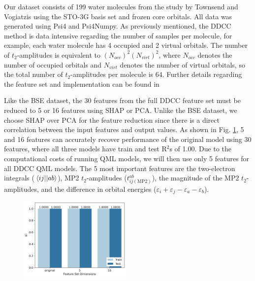 \documentclass[journal=jacsat,manuscript=article]{achemso}
\begin{document}
Our dataset consists of 199 water molecules from the study by Townsend and Vogiatzis using the STO-3G basis set\cite{hehre_selfconsistent_1970} and frozen core orbitals.
All data was generated using Psi4\cite{parrish_psi4_2017} and Psi4Numpy\cite{smith_psi4numpy_2018}.
As previously mentioned, the DDCC method is data intensive regarding the number of samples per molecule, for example, each water molecule has 4 occupied and 2 virtual orbitals.
The number of $t_{2}$-amplitudes is equivalent to $(N_{occ})^{2}(N_{virt})^{2}$, where $N_{occ}$ denotes the number of occupied orbitals and $N_{virt}$ denotes the number of virtual orbitals, so the total number of $t_{2}$-amplitudes per molecule is 64.
Further details regarding the feature set and implementation can be found in \cite{townsend_data-driven_2019}

Like the BSE dataset, the 30 features from the full DDCC feature set must be reduced to 5 or 16 features using SHAP or PCA.
Unlike the BSE dataset, we choose SHAP over PCA for the feature reduction since there is a direct correlation between the input features and output values.
As shown in Fig. \ref{fig:DDCC_feature_set}, 5 and 16 features can accurately recover performance of the original model using 30 features, where all three models have train and test R$^{2}$s of 1.00.
Due to the computational costs of running QML models, we will then use only 5 features for all DDCC QML models.
The 5 most important features are the two-electron integrals ($\mel{ij}{}{ab}$), MP2 $t_{2}$-amplitudes ($t^{ab}_{ij(\text{MP2})}$), the magnitude of the MP2 $t_{2}$-amplitudes, and the difference in orbital energies ($\varepsilon_{i}+\varepsilon_{j}-\varepsilon_{a}-\varepsilon_{b}$).



\begin{figure}[H]
	\centering
	\includegraphics[width=0.49\textwidth]{../images/DDCC/DDCC_feature_set.png}
	\caption{}
	\label{fig:DDCC_feature_set}
\end{figure}


\end{document}
